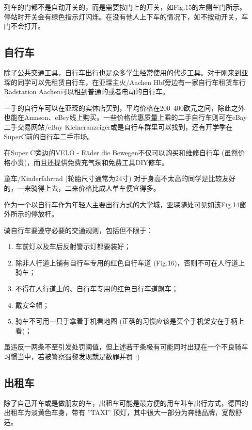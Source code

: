     列车的门都不是自动开关的，而是需要按门上的开关，如Fig.15的左侧车门所示。停站时开关会有绿色指示灯闪烁。在没有他人上下车的情况下，如不按动开关，车门不会打开。 

  \subsection{自行车}

    除了公共交通工具，自行车出行也是众多学生经常使用的代步工具。对于刚来到亚琛的同学可以先租赁自行车，在亚琛主火/Aachen Hbf旁边有一家自行车租赁车行Radstation Aachen可以租到普通的或者电动的自行车。

    一手的自行车可以在亚琛的实体店买到，平均价格在200~400欧元之间，除此之外也能在Amason、eBey线上购买。一些价格优惠质量上乘的二手自行车则可在eBay二手交易网站/eBay Kleineranzeiger或是自行车群里可以找到，还有开学季在SuperC前的自行车二手市场。

    在Super C旁边的VELO - Räder die Bewegen不仅可以购买和维修自行车 (虽然价格小贵)，而且还提供免费充气泵和免费工具DIY修车。

    童车/Kinderfahrrad (轮胎尺寸通常为24寸) 对于身高不太高的同学是比较友好的，一来骑得上去，二来价格比成人单车便宜得多。

    作为一个以自行车作为年轻人主要出行方式的大学城，亚琛随处可见如该Fig.14窗外所示的停放杆。

    骑自行车要遵守必要的交通规则，包括但不限于：

    \begin{enumerate}
      \item 车前灯以及车后反射警示灯都要装好；
      \item 除非人行道上铺有自行车专用的红色自行车道 (Fig.16)，否则不可在人行道上骑车；
      \item 不得在人行道上的、自行车专用的红色自行车道飙车；
      \item 戴安全帽；
      \item 骑车不可用一只手拿着手机看地图 (正确的习惯应该是买个手机架安在手柄上看)；
    \end{enumerate}

    虽违反一两条不至引发处罚阈值，但上述若干条极有可能同时出现在一个不良骑车习惯当中，若被警察蜀黎发现就是数罪并罚 :)

  \subsection{出租车}

    除了自己开车或是做朋友的车，出租车可能是最方便的用车叫车出行方式，德国的出租车为淡黄色车身，带有 ”TAXI” 顶灯，其中很大一部分为奔驰品牌，宽敞舒适。

